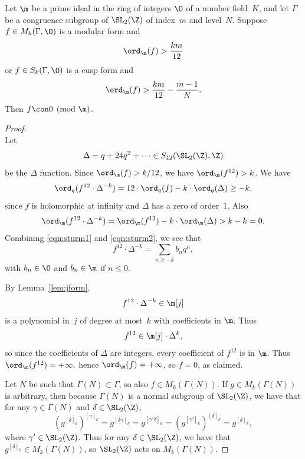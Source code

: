 \begin{theorem}[Sturm]\label{thm:sturm}
  Let $\m$ be a prime ideal in the ring of integers $\O$ of a
  number field~$K$, and let $\Gamma$ be a congruence subgroup
of $\SL_2(\Z)$ of index~$m$ and level~$N$.
Suppose $f\in M_k(\Gamma,\O)$ is a modular form
and 
$$
  \ord_\m(f) > \frac{km}{12}
$$
or $f \in S_k(\Gamma,\O)$ is a cusp form
and 
$$
\ord_\m(f) > \frac{km}{12} - \frac{m-1}{N}.
$$
Then $f\con 0\pmod{\m}$.
\end{theorem}
\begin{proof}
\\
Let 
$$
 \Delta  = q + 24q^2 + \cdots \in S_{12}(\SL_2(\Z),\Z)
$$
be the $\Delta$ function. 
Since $\ord_\m(f) > k/12$, we have $\ord_\m(f^{12}) > k$.
We have 
\begin{equation}\label{eqn:sturm1}
  \ord_q(f^{12}\cdot\Delta^{-k}) 
 = 12 \cdot \ord_q(f) - k\cdot \ord_q(\Delta) \geq -k,
\end{equation}
since $f$ is holomorphic at infinity and $\Delta$ has a zero of order~$1$.
Also
\begin{equation}\label{eqn:sturm2}
  \ord_\m(f^{12}\cdot \Delta^{-k}) =  \ord_\m(f^{12}) - k\cdot \ord_\m(\Delta)
          > k - k = 0.
\end{equation}
Combining \eqref{eqn:sturm1} and \eqref{eqn:sturm2}, we see that
$$
  f^{12} \cdot \Delta^{-k} = \sum_{n\geq -k} b_n q^n,
$$
with $b_n \in \O$ and $b_n\in \m$ if $n\leq 0$. 

By Lemma~\ref{lem:jform}, 
$$
   f^{12} \cdot \Delta^{-k} \in \m[j]
$$
is a polynomial in~$j$ of degree at most~$k$ with coefficients
in $\m$.
Thus 
$$
  f^{12} \in \m[j]\cdot \Delta^k,
$$
so since the coefficients of $\Delta$ are integers, 
every coefficient of $f^{12}$ is in $\m$.
Thus
$
\ord_\m(f^{12}) = +\infty,
$
hence 
$\ord_\m(f) = +\infty$, so $f=0$, as claimed.

\vspace{2ex}
\newcommand{\wM}{\mathfrak{M}}


Let $N$ be such that $\Gamma(N)\subset \Gamma$, so also
$f \in M_k(\Gamma(N))$.  
If $g\in M_k(\Gamma(N))$ is arbitrary, then
because $\Gamma(N)$ is a normal subgroup of $\SL_2(\Z)$,
we have that for any $\gamma \in\Gamma(N)$ and $\delta \in \SL_2(\Z)$,
$$
  (g^{[\delta]_k})^{[\gamma]_k} = g^{[\delta\gamma]_k}
          = g^{[\gamma'\delta]_k} = (g^{[\gamma']_k})^{[\delta]_k}
           = g^{[\delta]_k},
$$
where $\gamma'\in\SL_2(\Z)$.  Thus for any $\delta\in \SL_2(\Z)$,
we have that $g^{[\delta]_k} \in M_k(\Gamma(N))$, so $\SL_2(\Z)$
acts on $M_k(\Gamma(N))$.


\end{proof}
